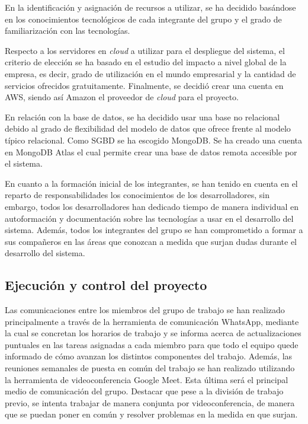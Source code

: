 \documentclass{article}
\begin{document}
En la identificación y asignación de recursos a utilizar, se ha decidido basándose en los conocimientos tecnológicos de cada integrante del grupo y el grado de familiarización con las tecnologías.
 
Respecto a los servidores en \textit{cloud} a utilizar para el despliegue del sistema, el criterio de elección se ha basado en el estudio del impacto a nivel global de la empresa, es decir, grado de utilización en el mundo empresarial y la cantidad de servicios ofrecidos gratuitamente. Finalmente, se decidió crear una cuenta en AWS, siendo así Amazon el proveedor de \textit{cloud} para el proyecto.
 
En relación con la base de datos, se ha decidido usar una base no relacional debido al grado de flexibilidad del modelo de datos que ofrece frente al modelo típico relacional. Como SGBD se ha escogido MongoDB. Se ha creado una cuenta en MongoDB Atlas el cual permite crear una base de datos remota accesible por el sistema.
 
En cuanto a la formación inicial de los integrantes, se han tenido en cuenta en el reparto de responsabilidades los conocimientos de los desarrolladores, sin embargo, todos los desarrolladores han dedicado tiempo de manera individual en autoformación y documentación sobre las tecnologías a usar en el desarrollo del sistema. Además, todos los integrantes del grupo se han comprometido a formar a sus compañeros en las áreas que conozcan a medida que surjan dudas durante el desarrollo del sistema.
 
\subsection{Ejecución y control del proyecto}
 
Las comunicaciones entre los miembros del grupo de trabajo se han realizado principalmente a través de la herramienta de comunicación WhatsApp, mediante la cual se concretan los horarios de trabajo y se informa acerca de actualizaciones puntuales en las tareas asignadas a cada miembro para que todo el equipo quede informado de cómo avanzan los distintos componentes del trabajo. Además, las reuniones semanales de puesta en común del trabajo se han realizado utilizando la herramienta de videoconferencia Google Meet. Esta última será el principal medio de comunicación del grupo. Destacar que pese a la división de trabajo previo, se intenta trabajar de manera conjunta por videoconferencia, de manera que se puedan poner en común y resolver problemas en la medida en que surjan.
 
\end{document}
